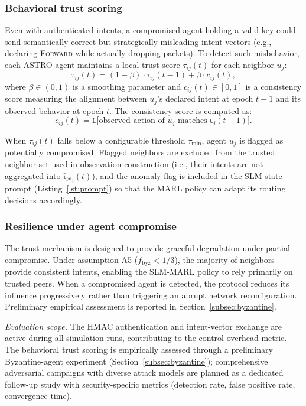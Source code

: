 \documentclass[5p,times]{elsarticle}
\begin{document}
\subsubsection{Behavioral trust scoring}

Even with authenticated intents, a compromised agent holding a valid key could send semantically correct but strategically misleading intent vectors (e.g., declaring \textsc{Forward} while actually dropping packets). To detect such misbehavior, each ASTRO agent maintains a local trust score $\tau_{ij}(t)$ for each neighbor $u_j$:
\begin{equation}
\label{eq:trust}
\tau_{ij}(t) = (1 - \beta) \cdot \tau_{ij}(t-1) + \beta \cdot c_{ij}(t),
\end{equation}
where $\beta \in (0,1)$ is a smoothing parameter and $c_{ij}(t) \in [0,1]$ is a consistency score measuring the alignment between $u_j$'s declared intent at epoch $t-1$ and its observed behavior at epoch $t$. The consistency score is computed as:
\begin{equation}
\label{eq:consistency}
c_{ij}(t) = \mathbb{1}\big[\text{observed action of } u_j \text{ matches } \boldsymbol{\iota}_j(t-1)\big].
\end{equation}

When $\tau_{ij}(t)$ falls below a configurable threshold $\tau_{\min}$, agent $u_j$ is flagged as potentially compromised. Flagged neighbors are excluded from the trusted neighbor set used in observation construction (i.e., their intents are not aggregated into $\bar{\boldsymbol{\iota}}_{\mathcal{N}_i}(t)$), and the anomaly flag is included in the SLM state prompt (Listing~\ref{lst:prompt}) so that the MARL policy can adapt its routing decisions accordingly.

\subsubsection{Resilience under agent compromise}

The trust mechanism is designed to provide graceful degradation under partial compromise. Under assumption A5 ($f_{\mathrm{byz}} < 1/3$), the majority of neighbors provide consistent intents, enabling the SLM-MARL policy to rely primarily on trusted peers. When a compromised agent is detected, the protocol reduces its influence progressively rather than triggering an abrupt network reconfiguration. Preliminary empirical assessment is reported in Section~\ref{subsec:byzantine}.

\textit{Evaluation scope.} The HMAC authentication and intent-vector exchange are active during all simulation runs, contributing to the control overhead metric. The behavioral trust scoring is empirically assessed through a preliminary Byzantine-agent experiment (Section~\ref{subsec:byzantine}); comprehensive adversarial campaigns with diverse attack models are planned as a dedicated follow-up study with security-specific metrics (detection rate, false positive rate, convergence time).
\end{document}
